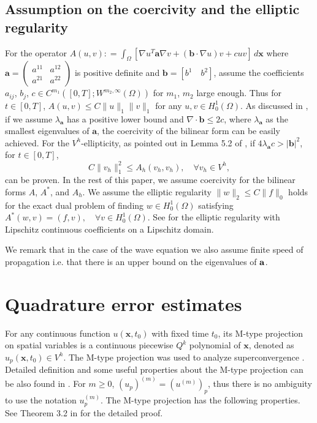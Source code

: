 \documentclass[onefignum,onetabnum]{siamart171218}
\begin{document}
\subsection{Assumption on the coercivity and the elliptic regularity}

For the operator $
A(u,v): =\int_\Omega [\nabla u^T \mathbf a \nabla v +(\mathbf b\cdot \nabla u) v + c u v] \,d\mathbf x $ 
where $\mathbf a=\begin{pmatrix}
               a^{11} & a^{12}\\
               a^{21} & a^{22}
              \end{pmatrix}
$ is positive definite and $\mathbf b=[b^1 \quad b^2]$, 
assume the coefficients $a_{ij}$, $b_j$, $c \in C^{m_1}\left([0,T];W^{m_2,\infty}(\Omega)\right)$ for $m_1$, $m_2$ large enough. Thus for $t\in [0,T]$, $A(u,v)\leq C\|u\|_1\|v\|_1$ for any $u, v\in H^1_0(\Omega)$. As discussed in \cite{li2020superconvergence}, if we assume $\lambda_{\mathbf a}$ has a positive lower bound and $ \nabla \cdot \mathbf b\leq 2c $, where $\lambda_{\mathbf a}$ as the smallest eigenvalues of $\mathbf a$, the coercivity of the bilinear form can be easily achieved. 
For the $V^h$-ellipticity, as pointed out in Lemma 5.2 of \cite{li2020superconvergence}, 
if $4\lambda_{\mathbf a}c > |\mathbf b|^2$, for $t\in[0,T]$,
\begin{equation}\label{vh-ellipticity}
C\|v_h\|_1^2 \leq A_h(v_h,v_h), \quad \forall v_h \in V^h,
\end{equation}
can be proven. In the rest of this paper, we assume coercivity for the bilinear forms $A$, $A^*$, and $A_h$. We  assume the elliptic regularity $\|w\|_2\leq C\|f\|_0$ holds for the exact dual problem of finding $w\in H^1_0(\Omega)$ satisfying
$A^*(w,v)=(f,v),\quad \forall v\in H_0^1(\Omega)$.
 See \cite{savare1998regularity, grisvard2011elliptic} for the elliptic regularity with Lipschitz continuous coefficients on a Lipschitz domain. 

We remark that in the case of the wave equation we also assume finite speed of propagation i.e. that there is an upper bound on the eigenvalues of ${\bf a}$.  

\section{Quadrature error estimates}\label{lemma-quadrature-error-estimate} 
 
For any continuous function $u(\mathbf x,t_0)$ with fixed time $t_0$,
its M-type projection on spatial variables  is a continuous piecewise $Q^k$ polynomial of $\mathbf x$,  denoted as $u_p(\mathbf x,t_0)\in V^h$. The M-type projection was used to analyze superconvergence \cite{chen2001structure}. 
Detailed definition and some useful properties about the M-type projection can be also found in \cite{li2020superconvergence1, li2020superconvergence}. For $m\geq 0$, $\left(u_p\right)^{(m)} = \left(u^{(m)}\right)_p$, thus there is no ambiguity to use the notation $u_p^{(m)}$. 
The M-type projection has the following properties. See Theorem 3.2 in  \cite{li2020superconvergence1} for the detailed proof.
\end{document}
